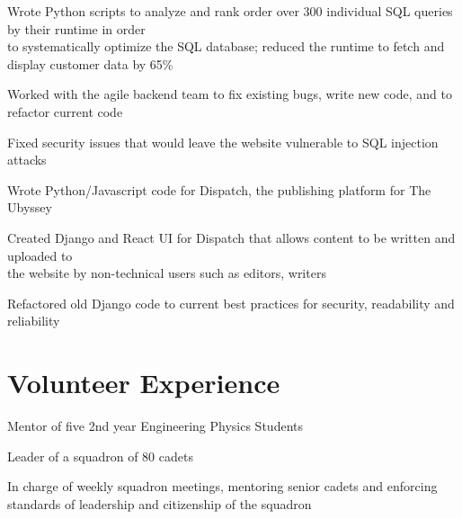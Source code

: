 \documentclass[]{deedy-resume-openfont}
\begin{document}
\begin{tightemize}
	\item Wrote Python scripts to analyze and rank order over 300 individual SQL queries by their runtime in order \\ to systematically optimize the SQL database; reduced the runtime to fetch and display customer data by 65\%
	\item Worked with the agile backend team to fix existing bugs, write new code, and to refactor current code
	\item Fixed security issues that would leave the website vulnerable to SQL injection attacks
\end{tightemize}
\vspace{8pt}

\begin{tightemize}
	\item Wrote Python/Javascript code for Dispatch, the publishing platform for The Ubyssey
	\item Created Django and React UI for Dispatch that allows content to be written and uploaded to \\ the website by non-technical users such as editors, writers
	\item Refactored old Django code to current best practices for security, readability and reliability
\end{tightemize}
\vspace{10pt}

\section{Volunteer Experience}
\begin{tightemize}
	\item Mentor of five 2nd year Engineering Physics Students
\end{tightemize}
\vspace{8pt}

\begin{tightemize}
	\item Leader of a squadron of 80 cadets
	\item In charge of weekly squadron meetings, mentoring senior cadets and enforcing standards of leadership and citizenship of the squadron
\end{tightemize}
\vspace{10pt}
\end{document}
